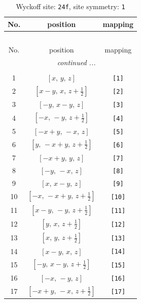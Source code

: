 \documentclass[fleqn,8pt]{jsarticle}
\begin{document}
\begin{longtable}{ccc}
\caption{Wyckoff site: {\tt 24f}, site symmetry: {\tt 1}}
 \\
 \hline \hline
No. & position & mapping \\ \hline \endfirsthead

\multicolumn{2}{l}{\tablename\ \thetable{}} \\
 \hline \hline
No. & position & mapping \\ \hline \endhead

 \hline \hline
\multicolumn{2}{r}{\footnotesize\it continued ...} \\ \endfoot

 \hline \hline
\multicolumn{2}{r}{} \\ \endlastfoot

1 & $\left[ x,\, y,\, z \right]$ & {\tt [1]} \\ \hline
2 & $\left[ x - y,\, x,\, z + \frac{1}{2} \right]$ & {\tt [2]} \\ \hline
3 & $\left[ - y,\, x - y,\, z \right]$ & {\tt [3]} \\ \hline
4 & $\left[ - x,\, - y,\, z + \frac{1}{2} \right]$ & {\tt [4]} \\ \hline
5 & $\left[ - x + y,\, - x,\, z \right]$ & {\tt [5]} \\ \hline
6 & $\left[ y,\, - x + y,\, z + \frac{1}{2} \right]$ & {\tt [6]} \\ \hline
7 & $\left[ - x + y,\, y,\, z \right]$ & {\tt [7]} \\ \hline
8 & $\left[ - y,\, - x,\, z \right]$ & {\tt [8]} \\ \hline
9 & $\left[ x,\, x - y,\, z \right]$ & {\tt [9]} \\ \hline
10 & $\left[ - x,\, - x + y,\, z + \frac{1}{2} \right]$ & {\tt [10]} \\ \hline
11 & $\left[ x - y,\, - y,\, z + \frac{1}{2} \right]$ & {\tt [11]} \\ \hline
12 & $\left[ y,\, x,\, z + \frac{1}{2} \right]$ & {\tt [12]} \\ \hline
13 & $\left[ x,\, y,\, z + \frac{1}{2} \right]$ & {\tt [13]} \\ \hline
14 & $\left[ x - y,\, x,\, z \right]$ & {\tt [14]} \\ \hline
15 & $\left[ - y,\, x - y,\, z + \frac{1}{2} \right]$ & {\tt [15]} \\ \hline
16 & $\left[ - x,\, - y,\, z \right]$ & {\tt [16]} \\ \hline
17 & $\left[ - x + y,\, - x,\, z + \frac{1}{2} \right]$ & {\tt [17]} \\ \hline

\end{longtable}
\end{document}
